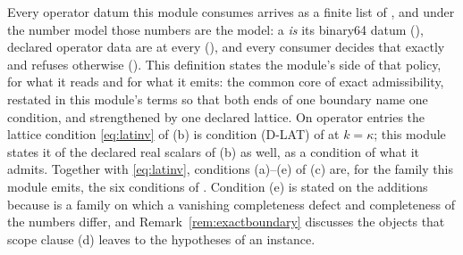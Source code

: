 
Every operator datum this module consumes arrives as a finite list of
, and under the number model those numbers are the
model: a  \emph{is} its binary64 datum
(), declared operator data are
 at every 
(), and every consumer decides that
exactly and refuses otherwise
(). This definition states the
module's side of that policy, for what it reads and for what it emits: the
common core of exact admissibility, restated in this module's terms so that
both ends of one boundary name one condition, and strengthened by one
declared lattice. On operator entries the lattice condition
\eqref{eq:latinv} of (b) is condition (D-LAT) of
 at $k=\kappa$; this module states it
of the declared real scalars of (b) as well, as a condition of what it
admits. Together with \eqref{eq:latinv}, conditions (a)--(e) of (c) are, for
the family this module emits, the six conditions of
. Condition (e) is stated on the
additions because  is a family
on which a vanishing completeness defect and completeness of the numbers
differ, and Remark~\ref{rem:exactboundary} discusses the objects that scope
clause (d) leaves to the hypotheses of an instance.

